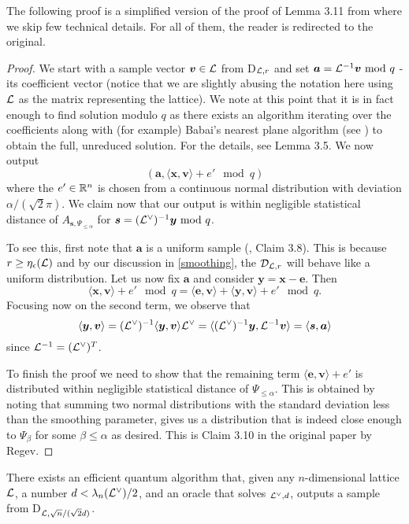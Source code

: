 The following proof is a simplified version of the proof of Lemma 3.11 from \cite{regev} where we skip few technical details. For all of them, the reader is redirected to the original.
\begin{proof}
	We start with a sample vector $\boldsymbol{v} \in \mathcal{L}$ from D$_{\mathcal{L}, r}$ and set $\boldsymbol{a} = \mathcal{L}^{-1} \boldsymbol{v} \text{ mod } q$ - its coefficient vector (notice that we are slightly abusing the notation here using $\mathcal{L}$ as the matrix representing the lattice). We note at this point that it is in fact enough to find solution modulo $q$ as there exists an algorithm iterating over the coefficients along with (for example) Babai's nearest plane algorithm (see \cite{babai}) to obtain the full, unreduced solution. For the details, see \cite{regev} Lemma 3.5. We now output
	\begin{equation} (\bm{a}, \langle \bm{x}, \bm{v} \rangle + e' \mod q) \end{equation}
	where the $e' \in \mathbb{R}^n$ is chosen from a continuous normal distribution with deviation $\alpha/(\sqrt{2} \pi)$. We claim now that our output is within negligible statistical distance of $A_{\bm{s}, \Psi_{\leq \alpha}}$ for $\boldsymbol{s} = (\mathcal{L}^{\vee})^{-1}\boldsymbol{y} \text{ mod } q$.

	To see this, first note that $\bm{a}$ is a uniform sample (\cite{regev}, Claim 3.8). This is because $r \geq \eta_{\epsilon}(\mathcal{L})$ and by our discussion in \ref{smoothing}, the $\mathcal{D}_{\mathcal{L}, r}$ will behave like a uniform distribution. Let us now fix $\bm{a}$ and consider $\bm{y} = \bm{x} - \bm{e}$. Then
	\[ \langle \bm{x}, \bm{v} \rangle + e' \mod q = \langle \bm{e}, \bm{v} \rangle + \langle \bm{y}, \bm{v} \rangle + e' \mod q. \]
Focusing now on the second term, we observe that
\[ \langle \boldsymbol{y}, \boldsymbol{v} \rangle = (\mathcal{L}^{\vee})^{-1} \langle \boldsymbol{y}, \boldsymbol{v} \rangle \mathcal{L}^{\vee} =  \langle (\mathcal{L}^{\vee})^{-1}\boldsymbol{y}, \mathcal{L}^{-1} \boldsymbol{v} \rangle = \langle \boldsymbol{s}, \boldsymbol{a} \rangle \]
since $\mathcal{L}^{-1} = (\mathcal{L}^{\vee})^T$.

To finish the proof we need to show that the remaining term $\langle \bm{e}, \bm{v} \rangle + e'$ is distributed within negligible statistical distance of $\Psi_{\leq \alpha}$. This is obtained by noting that summing two normal distributions with the standard deviation less than the smoothing parameter, gives us a distribution that is indeed close enough to $\Psi_{\beta}$ for some $\beta \leq \alpha$ as desired. This is Claim 3.10 in the original paper by Regev.
\end{proof}
\begin{proposition}\label{quantum}
	There exists an efficient quantum algorithm that, given any $n$-dimensional lattice $\mathcal{L}$, a number $d < \lambda_n (\mathcal{L}^{\vee})/2$, and an oracle that solves $_{\mathcal{L}^{\vee},d}$, outputs a sample from D$_{\mathcal{L},\sqrt{n}/(\sqrt{2}d)}$.
\end{proposition}

